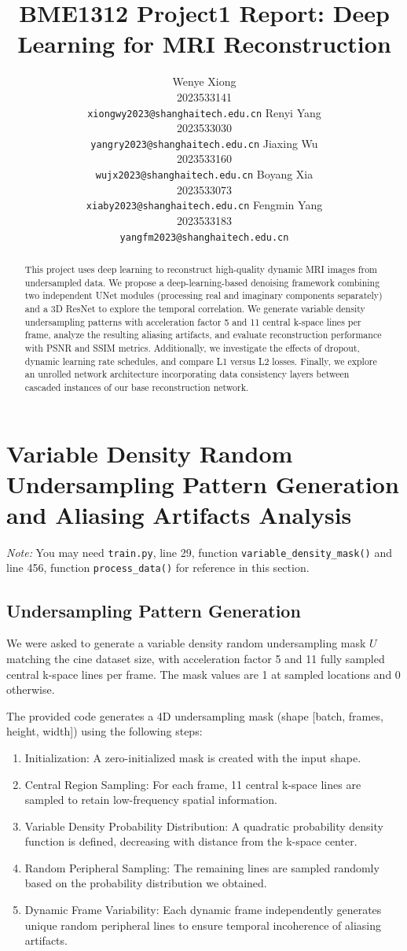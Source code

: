 \documentclass{article}
\title{BME1312 Project1 Report: Deep Learning for MRI Reconstruction}
\author{%
  Wenye Xiong \\
  2023533141 \\
  \texttt{xiongwy2023@shanghaitech.edu.cn}
  \And
  Renyi Yang \\
  2023533030 \\
  \texttt{yangry2023@shanghaitech.edu.cn}
  \AND
  Jiaxing Wu \\
  2023533160 \\
  \texttt{wujx2023@shanghaitech.edu.cn}
  \And
  Boyang Xia \\
  2023533073 \\
  \texttt{xiaby2023@shanghaitech.edu.cn}
  \AND
  Fengmin Yang \\
  2023533183 \\
  \texttt{yangfm2023@shanghaitech.edu.cn}
}
\begin{document}
\maketitle


\begin{abstract}
  This project uses deep learning to reconstruct high-quality dynamic MRI images
  from undersampled data. We propose a deep-learning-based denoising framework combining
  two independent UNet modules (processing real and imaginary components separately) and a 3D ResNet to explore the temporal correlation.
  We generate variable density undersampling patterns with acceleration factor 5 and
  11 central k-space lines per frame, analyze the resulting aliasing artifacts, and evaluate
  reconstruction performance with PSNR and SSIM metrics. Additionally,
  we investigate the effects of dropout, dynamic learning rate schedules,
  and compare L1 versus L2 losses. Finally, we explore an unrolled network architecture
  incorporating data consistency layers between cascaded instances of our base reconstruction network.
\end{abstract}

\section{Variable Density Random Undersampling Pattern Generation and Aliasing Artifacts Analysis}
\textit{Note: }You may need \texttt{train.py}, line 29, function \texttt{variable\_density\_mask()}
and line 456, function \texttt{process\_data()} for reference in this section.

\subsection{Undersampling Pattern Generation}
We were asked to generate a variable density random undersampling mask $U$ matching the cine
dataset size, with acceleration factor 5 and 11 fully sampled central k-space lines per frame.
The mask values are 1 at sampled locations and 0 otherwise.

The provided code generates a 4D undersampling mask (shape [batch, frames, height, width]) using the following steps:
\begin{enumerate}
  \item Initialization: A zero-initialized mask is created with the input shape.
  \item Central Region Sampling: For each frame, 11 central k-space lines are
        sampled to retain low-frequency spatial information.
  \item Variable Density Probability Distribution: A quadratic probability density
        function is defined, decreasing with distance from the k-space center.
  \item Random Peripheral Sampling: The remaining lines are sampled randomly
        based on the probability distribution we obtained.
  \item Dynamic Frame Variability: Each dynamic frame independently generates
        unique random peripheral lines to ensure temporal incoherence of aliasing artifacts.
\end{enumerate}
\end{document}
